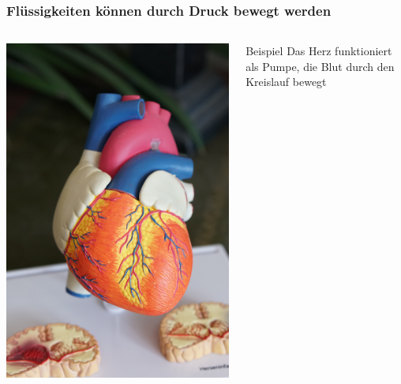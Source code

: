 \documentclass{beamer}
\begin{document}
\begin{frame}
\frametitle{Flüssigkeiten können durch Druck bewegt werden}

\begin{columns}[c]

\begin{column}{5cm}
\begin{center}
\includegraphics[width=\textwidth]{heart.jpg}
\end{center}
\end{column}

\begin{column}{5cm}
\begin{block}{Beispiel}
Das Herz funktioniert als Pumpe, die Blut durch den Kreislauf bewegt
\end{block}
\end{column}

\end{columns}


\end{frame}
\end{document}
